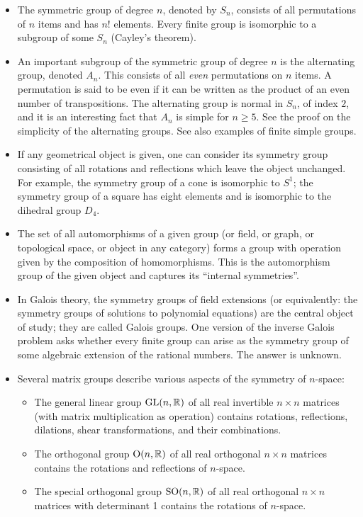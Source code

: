 \documentclass[12pt]{article}
\begin{document}
\begin{itemize}

\item The symmetric group of degree $n$, denoted by $S_n$, consists of
all permutations of $n$ items and has $n!$ elements. Every finite
group is isomorphic to a subgroup of some $S_n$ (Cayley's theorem).

\item An important subgroup of the symmetric group of degree $n$ is the 
alternating group, denoted $A_n$.  This consists of all \emph{even}
permutations on $n$ items.  A permutation is said to be even if it can
be written as the product of an even number of transpositions.  The alternating
group is normal in $S_n$, of index $2$, and it is an interesting fact that $A_n$
is simple for $n \geq 5$. See the proof on the simplicity of the alternating 
groups. See also examples of finite simple groups.

\item If any geometrical object is given, one can consider its
symmetry group consisting of all rotations and reflections which leave
the object unchanged. For example, the symmetry group of a cone is
isomorphic to $S^1$; the symmetry group of a square has eight elements and is isomorphic to the dihedral group $D_4$.

\item The set of all automorphisms of a given group (or field,
or graph, or topological space, or object in any category) forms a group with operation
given by the composition of homomorphisms. This is the automorphism group of the given object and captures its ``internal symmetries''.

\item In Galois theory, the symmetry groups of field extensions (or
equivalently: the symmetry groups of solutions to polynomial
equations) are the central object of study; they are called Galois groups.  One version of the inverse Galois problem asks whether every finite group can arise as the symmetry group of some algebraic extension of the rational numbers.  The answer is unknown.

\item Several matrix groups describe various aspects of the symmetry of $n$-space:
\begin{itemize}
\item The general linear group $\operatorname{GL}(n,\Bbb{R})$ of all real invertible
$n\times n$ matrices (with matrix multiplication as operation) contains
rotations, reflections, dilations, shear transformations, and their
combinations.
\item The orthogonal group $\operatorname{O}(n,\Bbb{R})$ of all real orthogonal
$n\times n$ matrices contains the rotations and reflections of $n$-space.
\item The special orthogonal group $\operatorname{SO}(n,\Bbb{R})$ of all real orthogonal
$n\times n$
matrices with determinant 1 contains the rotations of $n$-space.
\end{itemize}
 

\end{itemize}
\end{document}
